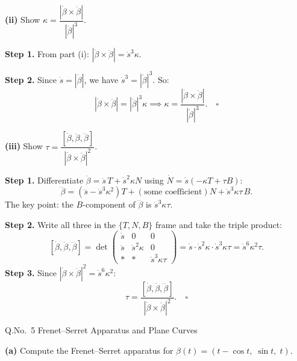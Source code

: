 \documentclass[12pt]{article}
\begin{document}
\vspace{10pt}
\textbf{(ii)} Show $\kappa=\dfrac{|\dot\beta\times\ddot\beta|}{|\dot\beta|^3}$.

\begin{ansbox}
\textbf{Step 1.} From part (i): $|\dot\beta\times\ddot\beta|=\dot s^3\kappa$.

\textbf{Step 2.} Since $\dot s=|\dot\beta|$, we have $\dot s^3=|\dot\beta|^3$. So:
\[
  |\dot\beta\times\ddot\beta|=|\dot\beta|^3\kappa \implies \kappa=\frac{|\dot\beta\times\ddot\beta|}{|\dot\beta|^3}.\quad\square
\]
\end{ansbox}

\vspace{10pt}
\textbf{(iii)} Show $\tau=\dfrac{[\dot\beta,\ddot\beta,\dddot\beta]}{|\dot\beta\times\ddot\beta|^2}$.

\begin{ansbox}
\textbf{Step 1.} Differentiate $\ddot\beta=\ddot s\,T+\dot s^2\kappa N$ using $\dot N=\dot s(-\kappa T+\tau B)$:
\[
  \dddot\beta=(\dddot s-\dot s^3\kappa^2)T + (\text{some coefficient})N + \dot s^3\kappa\tau\, B.
\]
The key point: the $B$-component of $\dddot\beta$ is $\dot s^3\kappa\tau$.

\textbf{Step 2.} Write all three in the $\{T,N,B\}$ frame and take the triple product:
\[
  [\dot\beta,\ddot\beta,\dddot\beta]
  =\det\!\begin{pmatrix}\dot s&0&0\\\ddot s&\dot s^2\kappa&0\\*&*&\dot s^3\kappa\tau\end{pmatrix}
  =\dot s\cdot\dot s^2\kappa\cdot\dot s^3\kappa\tau=\dot s^6\kappa^2\tau.
\]
\textbf{Step 3.} Since $|\dot\beta\times\ddot\beta|^2=\dot s^6\kappa^2$:
\[
  \tau=\frac{[\dot\beta,\ddot\beta,\dddot\beta]}{|\dot\beta\times\ddot\beta|^2}.\quad\square
\]
\end{ansbox}

\vspace{14pt}

\begin{qbox}{Q.No.\ 5}
Frenet--Serret Apparatus and Plane Curves
\end{qbox}

\vspace{6pt}
\textbf{(a)} Compute the Frenet--Serret apparatus for $\beta(t)=(t-\cos t,\;\sin t,\;t)$.
\end{document}
